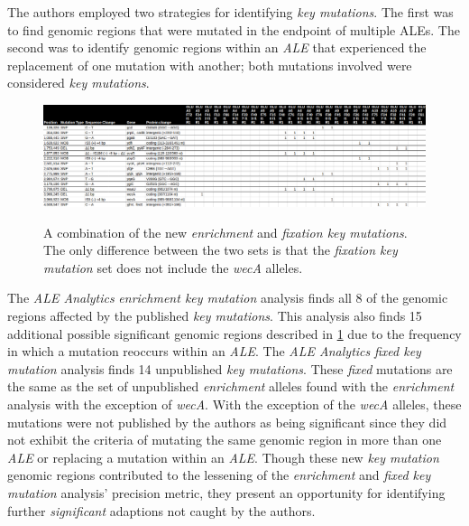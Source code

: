 \documentclass[12pt,final,masters,chapterheads]{ucsd}  %
\begin{document}
The authors employed two strategies for identifying \textit{key mutations}. The first was to find genomic regions that were mutated in the endpoint of multiple ALEs.
The second was to identify genomic regions within an \textit{ALE} that experienced the replacement of one mutation with another; both mutations involved were considered \textit{key mutations}.
\begin{figure}[H]
  \caption{A combination of the new \textit{enrichment} and \textit{fixation key mutations}. The only difference between the two sets is that the \textit{fixation key mutation} set does not include the \textit{wecA} alleles.}
  \centering
  \includegraphics[width=\textwidth]{glu_new_enrich_fix_muts.png}
  \label{fig:glu_new_enrich_fix_muts}
\end{figure}
The \textit{ALE Analytics }\textit{enrichment key mutation} analysis finds all 8 of the genomic regions affected by the published \textit{key mutations}. This analysis also finds 15 additional possible significant genomic regions described in \ref{fig:glu_new_enrich_fix_muts} due to the frequency in which a mutation reoccurs within an \textit{ALE}. The \textit{ALE Analytics} \textit{fixed key mutation} analysis finds 14 unpublished \textit{key mutations}. These \textit{fixed} mutations are the same as the set of unpublished \textit{enrichment} alleles found with the \textit{enrichment} analysis with the exception of \textit{wecA}. With the exception of the \textit{wecA} alleles, these mutations were not published by the authors as being significant since they did not exhibit the criteria of mutating the same genomic region in more than one \textit{ALE} or replacing a mutation within an \textit{ALE}. Though these new \textit{key mutation} genomic regions contributed to the lessening of the \textit{enrichment} and \textit{fixed key mutation} analysis' precision metric, they present an opportunity for identifying further \textit{significant} adaptions not caught by the authors.
\end{document}
